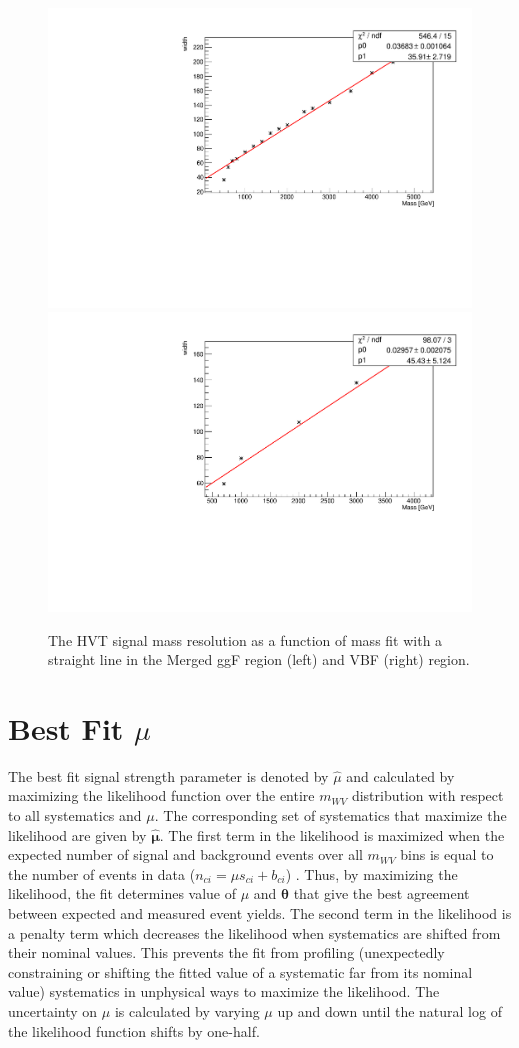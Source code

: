\begin{figure}[h!]
  \centering
  \includegraphics[width=0.48\hsize]{figures/Analysis/signal_mass_resolution/sigres_merged_1lephvt.pdf}
    \includegraphics[width=0.48\hsize]{figures/Analysis/signal_mass_resolution/sigres_merged_1lephvtvbf.pdf}
 \caption{The HVT signal mass resolution as a function of mass fit with a straight line in the Merged ggF region (left) and VBF (right) region. } 
  \label{fig:merged_sigwidth}
\end{figure} 
\FloatBarrier

\section{Best Fit $\mu$}
The best fit signal strength parameter is denoted by $\hat{\mu}$ and calculated by maximizing the likelihood function over the entire $m_{WV}$ distribution with respect to all systematics and $\mu$. The corresponding set of systematics that maximize the likelihood are given by $\bm{\hat{\mu}}$. The first term in the likelihood is maximized when the expected number of signal and background events over all $m_{WV}$ bins is equal to the number of events in data ($n_{ci}=\mu s_{ci} + b_{ci}$) . Thus, by maximizing the likelihood, the fit determines value of $\mu$ and $\bm{\theta}$ that give the best agreement between expected and measured event yields. The second term in the likelihood is a penalty term which decreases the likelihood when systematics are shifted from their nominal values. This prevents the fit from profiling (unexpectedly constraining or shifting the fitted value of a systematic far from its nominal value) systematics in unphysical ways to maximize the likelihood. The uncertainty on $\mu$ is calculated by varying $\mu$ up and down until the natural log of the likelihood function shifts by one-half.


